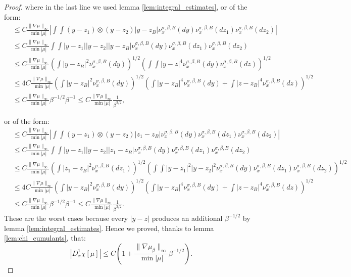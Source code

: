 \documentclass[10pt,a4paper]{amsart}
\begin{document}
\begin{proof}
where in the last line we used lemma \ref{lem:integral_estimates}, or of the form:
\begin{align*}
&\leq C\frac{\|\nabla \mu\|_\infty}{\min |\mu|}\left|\int\int (y-z_1)\otimes(y-z_2) |y-z_B| \nu_x^{\sigma, \beta, B}(dy)  \nu_x^{\sigma, \beta, B}(dz_1) \nu_x^{\sigma, \beta, B}(dz_2)\right|\\
&\leq C\frac{\|\nabla \mu\|_\infty}{\min |\mu|}\int\int |y-z_1||y-z_2| |y-z_B| \nu_x^{\sigma, \beta, B}(dy)  \nu_x^{\sigma, \beta, B}(dz_1) \nu_x^{\sigma, \beta, B}(dz_2)\\
&\leq C\frac{\|\nabla \mu\|_\infty}{\min |\mu|} \left(\int |y-z_B|^2 \nu_x^{\sigma, \beta, B}(dy)\right)^{1/2} \left(\int\int|y-z|^4\nu_x^{\sigma, \beta, B}(dy)\nu_x^{\sigma, \beta, B}(dz) \right)^{1/2} \\
&\leq 4C\frac{\|\nabla \mu\|_\infty}{\min |\mu|} \left(\int|y-z_B|^2\nu_x^{\sigma, \beta, B}(dy)\right)^{1/2} \left( \int |y-z_B|^4 \nu_x^{\sigma, \beta, B}(dy)+\int |z-z_B|^4 \nu_x^{\sigma, \beta, B}(dz)\right)^{1/2}\\
&\leq C\frac{\|\nabla \mu\|_\infty}{\min |\mu|} \beta^{-1/2}\beta^{-1}\leq C\frac{\|\nabla \mu\|_\infty}{\min |\mu|}\frac{1}{\beta^{3/2}},
\end{align*}

or of the form:
\begin{align*}
&\leq C\frac{\|\nabla \mu\|_\infty}{\min |\mu|}\left|\int\int (y-z_1)\otimes(y-z_2) |z_1-z_B| \nu_x^{\sigma, \beta, B}(dy)  \nu_x^{\sigma, \beta, B}(dz_1) \nu_x^{\sigma, \beta, B}(dz_2)\right|\\
&\leq C\frac{\|\nabla \mu\|_\infty}{\min |\mu|}\int\int |y-z_1||y-z_2| |z_1-z_B| \nu_x^{\sigma, \beta, B}(dy)  \nu_x^{\sigma, \beta, B}(dz_1) \nu_x^{\sigma, \beta, B}(dz_2)\\
&\leq C\frac{\|\nabla \mu\|_\infty}{\min |\mu|} \left(\int |z_1-z_B|^2 \nu_x^{\sigma, \beta, B}(dz_1)\right)^{1/2} \left(\int\int|y-z_1|^2|y-z_2|^2\nu_x^{\sigma, \beta, B}(dy)\nu_x^{\sigma, \beta, B}(dz_1)\nu_x^{\sigma, \beta, B}(dz_2) \right)^{1/2}  \\
&\leq 4C\frac{\|\nabla \mu\|_\infty}{\min |\mu|} \left(\int|y-z_B|^2\nu_x^{\sigma, \beta, B}(dy)\right)^{1/2} \left( \int |y-z_B|^4 \nu_x^{\sigma, \beta, B}(dy)+\int |z-z_B|^4 \nu_x^{\sigma, \beta, B}(dz)\right)^{1/2}\\
&\leq C\frac{\|\nabla \mu\|_\infty}{\min |\mu|} \beta^{-1/2}\beta^{-1}\leq C\frac{\|\nabla \mu\|_\infty}{\min |\mu|}\frac{1}{\beta^{3/2}}.
\end{align*}
These are the worst cases because every $|y-z|$ produces an additional $\beta^{-1/2}$ by lemma \ref{lem:integral_estimates}.
Hence we proved, thanks to lemma \ref{lem:chi_cumulants}, that:
$$
|D^1_x\chi[\mu]| \leq C\left(1+\frac{\|\nabla \mu_\beta\|_\infty}{\min |\mu|}\beta^{-1/2}\right).
$$


\end{proof}
\end{document}
